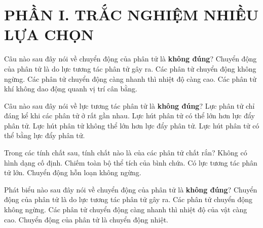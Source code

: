 

\section*{PHẦN I. TRẮC NGHIỆM NHIỀU LỰA CHỌN}



\begin{ex}
Câu nào sau đây nói về chuyển động của phân tử là \textbf{không đúng}?
\choice
{\True Chuyển động của phân tử là do lực tương tác phân tử gây ra.}
{Các phân tử chuyển động không ngừng.}
{Các phân tử chuyển động càng nhanh thì nhiệt độ càng cao.}
{Các phân tử khí không dao động quanh vị trí cân bằng.}
\end{ex}


\begin{ex}
Câu nào sau đây nói về lực tương tác phân tử là \textbf{không đúng}?
\choice
{Lực phân tử chỉ đáng kể khi các phân tử ở rất gần nhau.}
{Lực hút phân tử có thể lớn hơn lực đẩy phân tử.}
{\True Lực hút phân tử không thể lớn hơn lực đẩy phân tử.}
{Lực hút phân tử có thể bằng lực đẩy phân tử.}
\end{ex}


\begin{ex}
Trong các tính chất sau, tính chất nào là của các phân tử chất rắn?
\choice
{Không có hình dạng cố định.}
{Chiếm toàn bộ thể tích của bình chứa.}
{\True Có lực tương tác phân tử lớn.}
{Chuyển động hỗn loạn không ngừng.}
\end{ex}


\begin{ex}
Phát biểu nào sau đây nói về chuyển động của phân tử là \textbf{không đúng}?
\choice
{\True Chuyển động của phân tử là do lực tương tác phân tử gây ra.}
{Các phân tử chuyển động không ngừng.}
{Các phân tử chuyển động càng nhanh thì nhiệt độ của vật càng cao.}
{Chuyển động của phân tử là chuyển động nhiệt.}
\end{ex}


